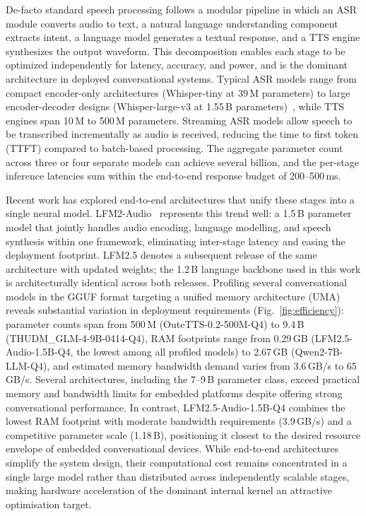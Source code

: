 \documentclass[manuscript,]{acmart} %
\begin{document}
De-facto standard speech processing follows a modular pipeline in which an ASR module converts audio to text, a natural language
understanding component extracts intent, a language model generates a textual
response, and a TTS engine synthesizes the output waveform.
This decomposition enables each stage to be optimized independently for
latency, accuracy, and power, and is the dominant architecture in deployed
conversational systems.
Typical ASR models range from compact encoder-only architectures
(Whisper-tiny at 39\,M parameters) to large encoder-decoder designs
(Whisper-large-v3 at 1.55\,B parameters)~\cite{radford2023whisper}, while
TTS engines span 10\,M to 500\,M parameters.
Streaming ASR models allow speech to be transcribed incrementally as audio is
received, reducing the time to first token (TTFT) compared to batch-based processing.
The aggregate parameter count across three or four separate models can achieve 
several billion, and the per-stage inference latencies sum within the
end-to-end response budget of 200--500\,ms.

Recent work has explored end-to-end architectures that unify these stages into
a single neural model.
LFM2-Audio~\cite{amini2025lfm2technicalreport} represents this trend well: a 1.5\,B
parameter model that jointly handles audio encoding, language modelling, and
speech synthesis within one framework, eliminating inter-stage latency and
easing the deployment footprint. LFM2.5 denotes a subsequent release of the same
architecture with updated weights; the 1.2\,B language backbone used in this work
is architecturally identical across both releases.
Profiling several conversational models in the GGUF format targeting a unified memory architecture (UMA) reveals substantial
variation in deployment requirements (Fig.~\ref{fig:efficiency}): parameter
counts span from 500\,M (OuteTTS-0.2-500M-Q4) to 9.4\,B
(THUDM\_GLM-4-9B-0414-Q4), RAM footprints range from 0.29\,GB
(LFM2.5-Audio-1.5B-Q4, the lowest among all profiled models) to 2.67\,GB
(Qwen2-7B-LLM-Q4), and estimated memory bandwidth demand varies from
3.6\,GB/s to 65\,GB/s.
Several architectures, including the 7--9\,B parameter class, exceed practical
memory and bandwidth limits for embedded platforms despite offering strong
conversational performance.
In contrast, LFM2.5-Audio-1.5B-Q4 combines the lowest RAM footprint with
moderate bandwidth requirements (3.9\,GB/s) and a competitive parameter scale
(1.18\,B), positioning it closest to the desired resource envelope of embedded
conversational devices.
While end-to-end architectures simplify the system design, their computational
cost remains concentrated in a single large model rather than distributed across
independently scalable stages, making hardware acceleration of the dominant
internal kernel an attractive optimisation target.
\end{document}
